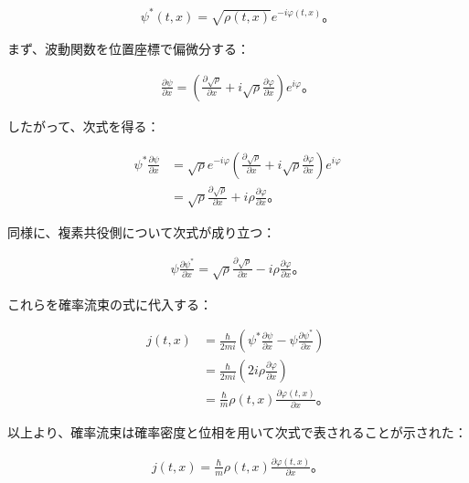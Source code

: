 \documentclass[platex,dvipdfmx,a4paper]{jsarticle}
\newcommand{\hb}[2]{\frac{\partial #1}{\partial #2}}
\begin{document}
\begin{align*}
  \psi^*(t,x)
  =\sqrt{\rho(t,x)}e^{-i\varphi(t,x)}。
\end{align*}

まず、波動関数を位置座標で偏微分する：

\begin{align*}
  \hb{\psi}{x}
  =\left(
    \hb{\sqrt{\rho}}{x}
    +i\sqrt{\rho}\hb{\varphi}{x}
  \right)e^{i\varphi}。
\end{align*}

したがって、次式を得る：

\begin{align*}
  \psi^*\hb{\psi}{x}
  &=\sqrt{\rho}e^{-i\varphi}
  \left(
    \hb{\sqrt{\rho}}{x}
    +i\sqrt{\rho}\hb{\varphi}{x}
  \right)e^{i\varphi} \\
  &=\sqrt{\rho}\hb{\sqrt{\rho}}{x}
  +i\rho\hb{\varphi}{x}。
\end{align*}

同様に、複素共役側について次式が成り立つ：

\begin{align*}
  \psi\hb{\psi^*}{x}
  =\sqrt{\rho}\hb{\sqrt{\rho}}{x}
  -i\rho\hb{\varphi}{x}。
\end{align*}

これらを確率流束の式に代入する：

\begin{align*}
  j(t,x)
  &=\frac{\hbar}{2mi}
  \left(
    \psi^*\hb{\psi}{x}
    -\psi\hb{\psi^*}{x}
  \right) \\
  &=\frac{\hbar}{2mi}
  \left(
    2i\rho\hb{\varphi}{x}
  \right) \\
  &=\frac{\hbar}{m}
  \rho(t,x)\hb{\varphi(t,x)}{x}。
\end{align*}

以上より、確率流束は確率密度と位相を用いて次式で表されることが示された：

\begin{align*}
  j(t,x)
  =\frac{\hbar}{m}
  \rho(t,x)\hb{\varphi(t,x)}{x}。
\end{align*}
\end{document}
